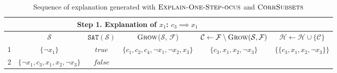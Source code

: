 \documentclass[twoside,11pt]{article}
\newcommand\m[1]{\mathcal{#1}}
\newcommand\setstohit{\ensuremath{\m{H} }\xspace}
\newcommand\formula{\ensuremath{\m{F} }\xspace}
\newcommand\mm[1]{\ensuremath{#1}\xspace}
\newcommand\call[1]{\mm{\textsc{#1}}}
\newcommand\corrsubsets{\mm{\call{CorrSubsets}}}
\newcommand\sat{\texttt{{SAT}}\xspace}
\newcommand\grow{\mm{\call{Grow}}}
\newcommand\onestepo{\ensuremath{\call{Explain-One-Step-ocus}} \xspace}
\begin{document}
\begin{table}[!h]
\centering
\begin{tabular}{lccccc} 
	\multicolumn{5}{c}{Step 1. Explanation of $x_1$: $c_3 \implies x_1$}\\
	\toprule[2pt]
	  & $\m{S}$                             & $\sat(\m{S})$    & \grow($\m{S}$, $\formula$)                                 & $\m{C} \gets  \formula \setminus \grow(\m{S}, \formula)$ &  $\setstohit  \gets \setstohit  \cup \{  \m{C}\}$ \\ 
	\toprule[2pt]
	1 & $\{ \lnot x_1\}$                    & $\mathit{true}$  & $\{c_1, c_2, c_4, \lnot x_1, \lnot x_2, x_3 \}$            & $\{ c_3, x_1, x_2, \lnot x_3 \}$ &  $\{ \{c_3, x_1, x_2, \lnot x_3 \}\}$ \\
	\midrule	
	2 & $\{ \lnot x_1, c_3, x_1, x_2, \lnot x_3\}$  & $\mathit{false}$  &  & &\\
				
\end{tabular}
\caption{Sequence of explanation generated with \onestepo and \corrsubsets}
\label{tab:explanation-steps-expanded:step1}
\end{table}
\end{document}
